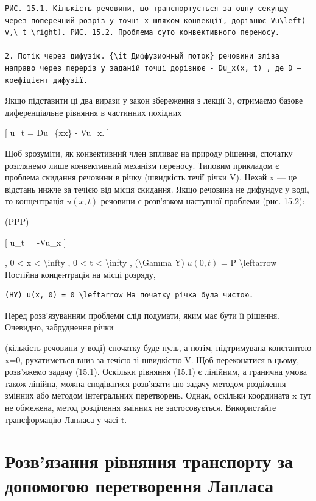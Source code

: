 \documentclass[
]{article}
\begin{document}
\begin{verbatim}
РИС. 15.1. Кількість речовини, що транспортується за одну секунду через поперечний розріз у точці x шляхом конвекції, дорівнює Vu\left( v,\ t \right). РИС. 15.2. Проблема суто конвективного переносу.

2. Потік через дифузію. {\it Диффузионный поток} речовини зліва направо через переріз у заданій точці дорівнює - Du_x(x, t) , де D — коефіцієнт дифузії.
\end{verbatim}

Якщо підставити ці два вирази у закон збереження з лекції 3, отримаємо
базове диференціальне рівняння в частинних похідних

{[} u\_t = Du\_\{xx\} - Vu\_x. {]}

Щоб зрозуміти, як конвективний член впливає на природу рішення, спочатку
розглянемо лише конвективний механізм переносу. Типовим прикладом є
проблема скидання речовини в річку (швидкість течії річки V). Нехай x
--- це відстань нижче за течією від місця скидання. Якщо речовина не
дифундує у воді, то концентрація \(u(x, t)\) речовини є розв'язком
наступної проблеми (рис. 15.2):

(PPP)

{[} u\_t = -Vu\_x {]}

, 0 \textless{} x \textless{} \textbackslash infty , 0 \textless{} t
\textless{} \textbackslash infty , (\textbackslash Gamma Y) \(u(0, t)\)
= P \textbackslash leftarrow Постійна концентрація на місці розряду,

\begin{verbatim}
(НУ) u(x, 0) = 0 \leftarrow На початку річка була чистою.
\end{verbatim}

Перед розв'язуванням проблеми слід подумати, яким має бути її рішення.
Очевидно, забруднення річки

(кількість речовини у воді) спочатку буде нуль, а потім, підтримувана
константою x=0, рухатиметься вниз за течією зі швидкістю V. Щоб
переконатися в цьому, розв'яжемо задачу (15.1). Оскільки рівняння (15.1)
є лінійним, а гранична умова також лінійна, можна сподіватися розв'язати
цю задачу методом розділення змінних або методом інтегральних
перетворень. Однак, оскільки координата x тут не обмежена, метод
розділення змінних не застосовується. Використайте трансформацію Лапласа
у часі t.

\section{Розв'язання рівняння транспорту за допомогою перетворення
Лапласа}\label{ux440ux43eux437ux432ux44fux437ux430ux43dux43dux44f-ux440ux456ux432ux43dux44fux43dux43dux44f-ux442ux440ux430ux43dux441ux43fux43eux440ux442ux443-ux437ux430-ux434ux43eux43fux43eux43cux43eux433ux43eux44e-ux43fux435ux440ux435ux442ux432ux43eux440ux435ux43dux43dux44f-ux43bux430ux43fux43bux430ux441ux430}
\end{document}
